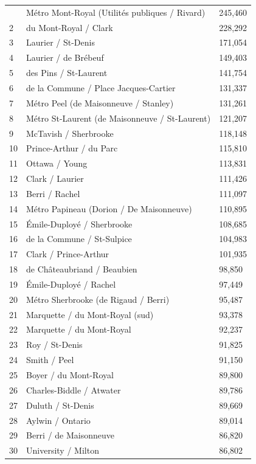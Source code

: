 \documentclass[preprint,authoryear,10pt]{elsarticle}
\begin{document}
\begin{longtable}{@{}p{} p{} p{}@{}}
\hline
\endlastfoot
1 & Métro Mont-Royal (Utilités publiques / Rivard) & 245,460 \\
2 & du Mont-Royal / Clark & 228,292 \\
3 & Laurier / St-Denis & 171,054 \\
4 & Laurier / de Brébeuf & 149,403 \\
5 & des Pins / St-Laurent & 141,754 \\
6 & de la Commune / Place Jacques-Cartier & 131,337 \\
7 & Métro Peel (de Maisonneuve / Stanley) & 131,261 \\
8 & Métro St-Laurent (de Maisonneuve / St-Laurent) & 121,207 \\
9 & McTavish / Sherbrooke & 118,148 \\
10 & Prince-Arthur / du Parc & 115,810 \\
11 & Ottawa / Young & 113,831 \\
12 & Clark / Laurier & 111,426 \\
13 & Berri / Rachel & 111,097 \\
14 & Métro Papineau (Dorion / De Maisonneuve) & 110,895 \\
15 & Émile-Duployé / Sherbrooke & 108,685 \\
16 & de la Commune / St-Sulpice & 104,983 \\
17 & Clark / Prince-Arthur & 101,935 \\
18 & de Châteaubriand / Beaubien & 98,850 \\
19 & Émile-Duployé / Rachel & 97,449 \\
20 & Métro Sherbrooke (de Rigaud / Berri) & 95,487 \\
21 & Marquette / du Mont-Royal (sud) & 93,378 \\
22 & Marquette / du Mont-Royal & 92,237 \\
23 & Roy / St-Denis & 91,825 \\
24 & Smith / Peel & 91,150 \\
25 & Boyer / du Mont-Royal & 89,800 \\
26 & Charles-Biddle / Atwater & 89,786 \\
27 & Duluth / St-Denis & 89,669 \\
28 & Aylwin / Ontario & 89,014 \\
29 & Berri / de Maisonneuve & 86,820 \\
30 & University / Milton & 86,802 \\
\end{longtable}
\normalsize
\end{document}
